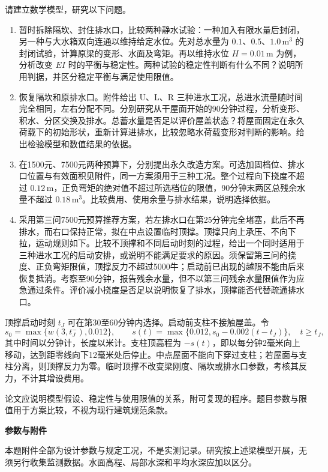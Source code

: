 \documentclass[11pt,a4paper]{article}
\begin{document}
请建立数学模型，研究以下问题。
\begin{enumerate}
\item 暂时拆除隔坎、封住排水口，比较两种静水试验：一种加入有限水量后封闭，另一种与大水箱双向连通以维持给定水位。先对总水量为 $0.1、0.5、1.0\,\mathrm{m^3}$ 的封闭试验，计算原梁的变形、水面及弯矩。再以维持水位 $H=0.01\,\mathrm m$ 为例，分析改变 $EI$ 时的平衡与稳定性。两种试验的稳定性判断有什么不同？说明所用判据，并区分稳定平衡与满足使用限值。
\item 恢复隔坎和原排水口。附件给出 U、L、R 三种进水工况，总进水流量随时间完全相同，左右分配不同。分别研究从干屋面开始的90分钟过程，分析变形、积水、分区交换及排水。总蓄水量是否足以评价屋盖状态？将屋面固定在永久荷载下的初始形状，重新计算进排水，比较忽略水荷载变形对判断的影响。给出检验模型和数值结果的依据。
\item 在1500元、7500元两种预算下，分别提出永久改造方案。可选加固档位、排水口位置与有效面积见附件，同一方案须用于三种工况。整个过程向下挠度不超过 $0.12\,\mathrm m$，正负弯矩的绝对值不超过所选档位的限值，90分钟末两区总残余水量不超过 $0.18\,\mathrm{m^3}$。比较费用、使用余量与排水结果，说明选择依据。
\item 采用第三问7500元预算推荐方案，若左排水口在第25分钟完全堵塞，此后不再排水，而右口保持正常，拟在中点设置临时顶撑。顶撑只向上承压、不向下拉，运动规则如下。比较不顶撑和不同启动时刻的过程，给出一个同时适用于三种进水工况的启动安排，或说明不能满足要求的原因。须保留第三问的挠度、正负弯矩限值，顶撑反力不超过5000牛；启动前已出现的越限不能由后来恢复抵消。考察至90分钟，报告残余水量，但不以第三问残余水量限值作为应急通过条件。评价减小挠度是否足以说明恢复了排水，顶撑能否代替疏通排水口。
\end{enumerate}

顶撑启动时刻 $t_J$ 可在第30至60分钟内选择。启动前支柱不接触屋盖。令
\[
s_0=\max\{w(3,t_J^-),0.012\},\qquad
s(t)=\max\{0.012,s_0-0.002(t-t_J)\},\quad t\ge t_J,
\]
其中时间以分钟计，长度以米计。支柱顶高程为 $-s(t)$，即以每分钟2毫米向上移动，达到距零线向下12毫米处后停止。中点屋面不能向下穿过支柱；若屋面与支柱分离，则顶撑反力为零。临时顶撑不改变梁刚度、隔坎或排水口参数，考核其反力，不计其增设费用。

论文应说明模型假设、稳定性与使用限值的关系，附可复现的程序。题目参数与限值用于方案比较，不视为现行建筑规范条款。

\newpage
\begin{center}{\large\bfseries 参数与附件}\end{center}

本题附件全部为设计参数与规定工况，不是实测记录。研究按上述梁模型开展，无须另行收集监测数据。水面高程、局部水深和平均水深应加以区分。
\end{document}
